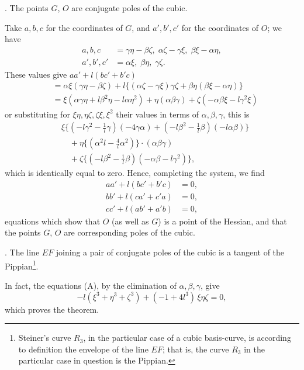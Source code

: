 \documentclass[11pt]{article}
\begin{document}
\medskip

. The points $G$, $O$ are conjugate poles of the cubic.

Take $a, b, c$ for the coordinates of $G$, and $a', b', c'$ for the coordinates of $O$; we have
\begin{align*}
a, b, c   &= \gamma\eta - \beta\zeta,\; \alpha\zeta - \gamma\xi,\; \beta\xi - \alpha\eta, \\
a', b', c'&= \alpha\xi,\; \beta\eta,\; \gamma\zeta.
\end{align*}
These values give $a a' + l(b c' + b' c)$
\begin{align*}
&= \alpha\xi(\gamma\eta - \beta\zeta) + l\bigl\{(\alpha\zeta - \gamma\xi)\gamma\zeta + \beta\eta(\beta\xi - \alpha\eta)\bigr\} \\
&= \xi(\alpha\gamma\eta + l \beta^2 \eta - l \alpha\eta^2) + \eta(\alpha\beta\gamma) + \zeta(-\alpha\beta\xi - l \gamma^2 \xi)
\end{align*}
or substituting for $\xi\eta, \eta\zeta, \zeta\xi, \xi^2$ their values in terms of $\alpha, \beta, \gamma$, this is
\begin{align*}
&\xi\bigl\{(-l \gamma^2 - \tfrac{1}{l}\gamma)(-4 \gamma\alpha) + (-l \beta^2 - \tfrac{1}{l}\beta)(-l \alpha\beta)\bigr\} \\
&\quad + \eta\bigl\{(\alpha^2 l - \tfrac{4}{l}\alpha^2)\bigr\} \cdot (\alpha\beta\gamma) \\
&\quad + \zeta\bigl\{(-l\beta^2 - \tfrac{1}{l}\beta)(-\alpha\beta - l\gamma^2)\bigr\},
\end{align*}
which is identically equal to zero. Hence, completing the system, we find
\begin{align*}
a a' + l(b c' + b' c) &= 0, \\
b b' + l(c a' + c' a) &= 0, \\
c c' + l(a b' + a' b) &= 0,
\end{align*}
equations which show that $O$ (as well as $G$) is a point of the Hessian, and that the points $G$, $O$ are corresponding poles of the cubic.

\medskip

. The line $EF$ joining a pair of conjugate poles of the cubic is a tangent of the Pippian\footnote{Steiner's curve $R_3$, in the particular case of a cubic basis-curve, is according to definition the envelope of the line $EF$; that is, the curve $R_3$ in the particular case in question is the Pippian.}.

In fact, the equations (A), by the elimination of $\alpha, \beta, \gamma$, give
\[
-l(\xi^3 + \eta^3 + \zeta^3) + (-1 + 4 l^3)\,\xi\eta\zeta = 0,
\]
which proves the theorem.
\end{document}
